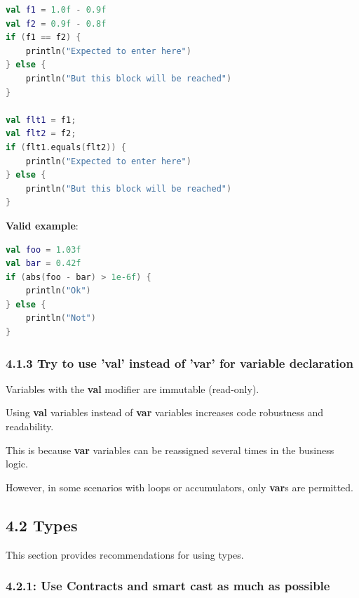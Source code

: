 \begin{lstlisting}[language=Kotlin]
val f1 = 1.0f - 0.9f
val f2 = 0.9f - 0.8f
if (f1 == f2) {
    println("Expected to enter here")
} else {
    println("But this block will be reached")
}

val flt1 = f1;
val flt2 = f2;
if (flt1.equals(flt2)) {
    println("Expected to enter here")
} else {
    println("But this block will be reached")
} 
\end{lstlisting}


\textbf{Valid example}:



\begin{lstlisting}[language=Kotlin]
val foo = 1.03f
val bar = 0.42f
if (abs(foo - bar) > 1e-6f) {
    println("Ok")
} else {
    println("Not")
}
\end{lstlisting}


\subsubsection*{\textbf{4.1.3 Try to use 'val' instead of 'var' for variable declaration}}
\leavevmode\newline

\label{sec:4.1.3}



Variables with the \textbf{val} modifier are immutable (read-only).

Using \textbf{val} variables instead of \textbf{var} variables increases code robustness and readability.

This is because \textbf{var} variables can be reassigned several times in the business logic.

However, in some scenarios with loops or accumulators, only \textbf{var}s are permitted.



\subsection*{\textbf{4.2 Types}}

\label{sec:4.2}

This section provides recommendations for using types.

\subsubsection*{\textbf{4.2.1: Use Contracts and smart cast as much as possible}}
\leavevmode\newline

